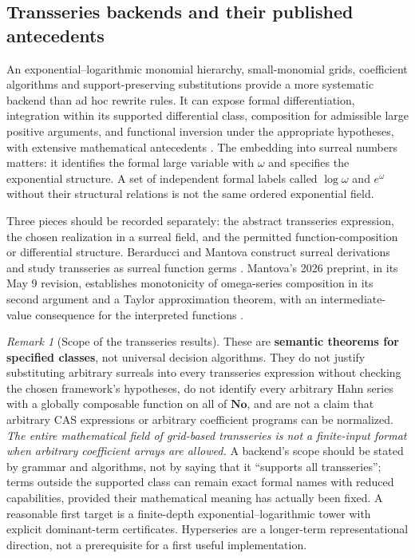 \documentclass[11pt,letterpaper]{article}
\numberwithin{equation}{section}
\theoremstyle{definition}
\theoremstyle{remark}
\newtheorem{remark}[theorem]{Remark}
\newcommand{\No}{\mathbf{No}}
\begin{document}
\subsection{Transseries backends and their published antecedents}
\label{cas:sub-transseries}
An exponential--logarithmic monomial hierarchy, small-monomial grids,
coefficient algorithms and support-preserving substitutions provide a more
systematic backend than ad hoc rewrite rules. It can expose formal
differentiation, integration within its supported differential class,
composition for admissible large positive arguments, and functional inversion
under the appropriate hypotheses, with extensive mathematical antecedents
\cite{cas:vdH}. The embedding into surreal numbers matters: it identifies the
formal large variable with $\omega$ and specifies the exponential structure. A
set of independent formal labels called $\log\omega$ and $e^\omega$ without
their structural relations is not the same ordered exponential field.

Three pieces should be recorded separately: the abstract transseries expression,
the chosen realization in a surreal field, and the permitted function-composition
or differential structure. Berarducci and Mantova construct surreal derivations
and study transseries as surreal function germs
\cite{cas:BMDerivations,cas:BMFunctions}. Mantova's 2026 preprint, in its May 9
revision, establishes monotonicity of omega-series composition in its second
argument and a Taylor approximation theorem, with an intermediate-value
consequence for the interpreted functions \cite{cas:Mantova2026}.

\begin{remark}[Scope of the transseries results]\label{cas:rem-transscope}
These are \textbf{semantic theorems for specified classes}, not universal
decision algorithms. They do not justify substituting arbitrary surreals into
every transseries expression without checking the chosen framework's
hypotheses, do not identify every arbitrary Hahn series with a globally
composable function on all of $\No$, and are not a claim that arbitrary CAS
expressions or arbitrary coefficient programs can be normalized. \emph{The
entire mathematical field of grid-based transseries is not a finite-input format
when arbitrary coefficient arrays are allowed.} A backend's scope should be
stated by grammar and algorithms, not by saying that it ``supports all
transseries''; terms outside the supported class can remain exact formal names
with reduced capabilities, provided their mathematical meaning has actually been
fixed. A reasonable first target is a finite-depth exponential--logarithmic
tower with explicit dominant-term certificates. Hyperseries
\cite{cas:Hyperseries} are a longer-term representational direction, not a
prerequisite for a first useful implementation.
\end{remark}
\end{document}
